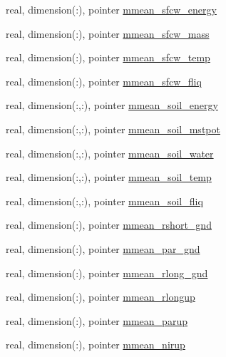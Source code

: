 \begin{DoxyCompactItemize}
real, dimension(\+:), pointer \hyperlink{structed__state__vars_1_1sitetype_af840171018ccd4985cd20419c9024e0c}{mmean\+\_\+sfcw\+\_\+energy}
\item 
real, dimension(\+:), pointer \hyperlink{structed__state__vars_1_1sitetype_afc0ff558df1cc3fd06a585163d22021e}{mmean\+\_\+sfcw\+\_\+mass}
\item 
real, dimension(\+:), pointer \hyperlink{structed__state__vars_1_1sitetype_a7e4f4a8c7af34c73985ebd822f66910c}{mmean\+\_\+sfcw\+\_\+temp}
\item 
real, dimension(\+:), pointer \hyperlink{structed__state__vars_1_1sitetype_a4dae43333e03eb672c38eeaa0d23cc70}{mmean\+\_\+sfcw\+\_\+fliq}
\item 
real, dimension(\+:,\+:), pointer \hyperlink{structed__state__vars_1_1sitetype_af8aa08a758524b9625a8c6d54c1ae8af}{mmean\+\_\+soil\+\_\+energy}
\item 
real, dimension(\+:,\+:), pointer \hyperlink{structed__state__vars_1_1sitetype_ad25eb184313e0b6888895b0e18b874eb}{mmean\+\_\+soil\+\_\+mstpot}
\item 
real, dimension(\+:,\+:), pointer \hyperlink{structed__state__vars_1_1sitetype_aad0e21afcc39929d1323c733f3d0ce8d}{mmean\+\_\+soil\+\_\+water}
\item 
real, dimension(\+:,\+:), pointer \hyperlink{structed__state__vars_1_1sitetype_ae82d142b6cd8bcfd306d131d16ead5de}{mmean\+\_\+soil\+\_\+temp}
\item 
real, dimension(\+:,\+:), pointer \hyperlink{structed__state__vars_1_1sitetype_a8a72f0c00e872e1651921e216ff736bc}{mmean\+\_\+soil\+\_\+fliq}
\item 
real, dimension(\+:), pointer \hyperlink{structed__state__vars_1_1sitetype_a1c6d07e59b72851977da97e9357e86b7}{mmean\+\_\+rshort\+\_\+gnd}
\item 
real, dimension(\+:), pointer \hyperlink{structed__state__vars_1_1sitetype_acb7bbe25a3473c88e184cdf5935e4c0e}{mmean\+\_\+par\+\_\+gnd}
\item 
real, dimension(\+:), pointer \hyperlink{structed__state__vars_1_1sitetype_a4ca6158b83225a244c11b69a3b3058f1}{mmean\+\_\+rlong\+\_\+gnd}
\item 
real, dimension(\+:), pointer \hyperlink{structed__state__vars_1_1sitetype_afee9f5b5ffcb2d42ff1fb813941f0c5d}{mmean\+\_\+rlongup}
\item 
real, dimension(\+:), pointer \hyperlink{structed__state__vars_1_1sitetype_a46cb4c24a31d7c31464cee0e0f2eedb9}{mmean\+\_\+parup}
\item 
real, dimension(\+:), pointer \hyperlink{structed__state__vars_1_1sitetype_a05d3a8f61b187fef76baa0eb7d483dd8}{mmean\+\_\+nirup}

\end{DoxyCompactItemize}
